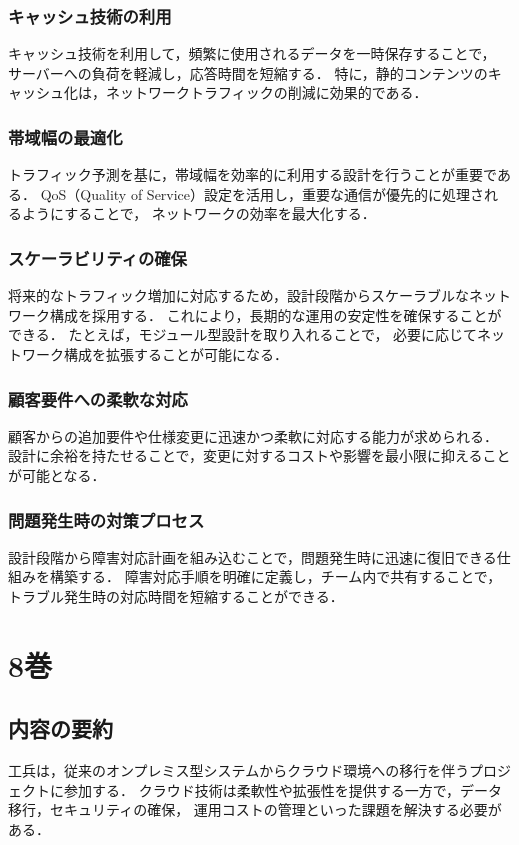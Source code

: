 \documentclass[titlepage,a4paper]{jsarticle}
\begin{document}
\subsubsection{キャッシュ技術の利用}
キャッシュ技術を利用して，頻繁に使用されるデータを一時保存することで，
サーバーへの負荷を軽減し，応答時間を短縮する．
特に，静的コンテンツのキャッシュ化は，ネットワークトラフィックの削減に効果的である．

\subsubsection{帯域幅の最適化}
トラフィック予測を基に，帯域幅を効率的に利用する設計を行うことが重要である．
QoS（Quality of Service）設定を活用し，重要な通信が優先的に処理されるようにすることで，
ネットワークの効率を最大化する．

\subsubsection{スケーラビリティの確保}
将来的なトラフィック増加に対応するため，設計段階からスケーラブルなネットワーク構成を採用する．
これにより，長期的な運用の安定性を確保することができる．
たとえば，モジュール型設計を取り入れることで，
必要に応じてネットワーク構成を拡張することが可能になる．

\subsubsection{顧客要件への柔軟な対応}
顧客からの追加要件や仕様変更に迅速かつ柔軟に対応する能力が求められる．
設計に余裕を持たせることで，変更に対するコストや影響を最小限に抑えることが可能となる．

\subsubsection{問題発生時の対策プロセス}
設計段階から障害対応計画を組み込むことで，問題発生時に迅速に復旧できる仕組みを構築する．
障害対応手順を明確に定義し，チーム内で共有することで，
トラブル発生時の対応時間を短縮することができる．
\newpage
\section{8巻}
\subsection{内容の要約}
工兵は，従来のオンプレミス型システムからクラウド環境への移行を伴うプロジェクトに参加する．
クラウド技術は柔軟性や拡張性を提供する一方で，データ移行，セキュリティの確保，
運用コストの管理といった課題を解決する必要がある．
\end{document}
